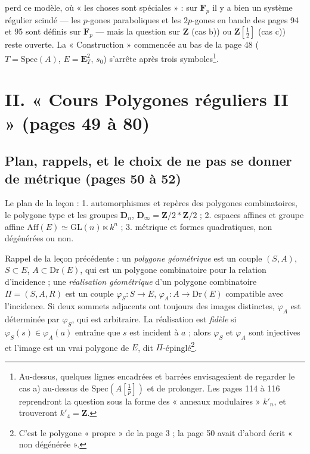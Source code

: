 \documentclass[11pt,a4paper]{article}
\begin{document}
perd ce modèle, où « les choses sont spéciales » : sur $\mathbf{F}_p$ il y a
bien un système régulier scindé --- les $p$-gones paraboliques et les
$2p$-gones en bande des pages 94 et 95 sont définis sur $\mathbf{F}_p$ --- mais
la question sur $\mathbf{Z}$ (cas b)) ou $\mathbf{Z}[\frac12]$ (cas c)) reste
ouverte. La « Construction » commencée au bas de la page 48 ($T =
\mathrm{Spec}(A)$, $E = \mathbf{E}^2_T$, $s_0$) s'arrête après trois
symboles\footnote{Au-dessus, quelques lignes encadrées et barrées
envisageaient de regarder le cas a) au-dessus de $\mathrm{Spec}(A[\frac1p])$ et
de prolonger. Les pages 114 à 116 reprendront la question sous la forme des
« anneaux modulaires » $k'_n$, et trouveront $k'_4 = \mathbf{Z}$.}.

\section*{II. « Cours Polygones réguliers II » (pages 49 à 80)}

\subsection*{Plan, rappels, et le choix de ne pas se donner de métrique (pages 50 à 52)}

Le plan de la leçon : 1. automorphismes et repères des polygones
combinatoires, le polygone type et les groupes $\mathbf{D}_n$,
$\mathbf{D}_\infty = \mathbf{Z}/2 * \mathbf{Z}/2$ ; 2. espaces affines et
groupe affine $\mathrm{Aff}(E) \simeq \mathrm{GL}(n) \ltimes k^n$ ; 3. métrique
et formes quadratiques, non dégénérées ou non.

Rappel de la leçon précédente : un \emph{polygone géométrique} est un couple
$(S, A)$, $S \subset E$, $A \subset \mathrm{Dr}(E)$, qui est un polygone
combinatoire pour la relation d'incidence ; une \emph{réalisation
géométrique} d'un polygone combinatoire $\Pi = (S, A, R)$ est un couple
$\varphi_S : S \to E$, $\varphi_A : A \to \mathrm{Dr}(E)$ compatible avec
l'incidence. Si deux sommets adjacents ont toujours des images distinctes,
$\varphi_A$ est déterminée par $\varphi_S$, qui est arbitraire. La réalisation
est \emph{fidèle} si $\varphi_S(s) \in \varphi_A(a)$ entraîne que $s$ est
incident à $a$ ; alors $\varphi_S$ et $\varphi_A$ sont injectives et l'image
est un vrai polygone de $E$, dit $\Pi$-épinglé\footnote{C'est le polygone
« propre » de la page 3 ; la page 50 avait d'abord écrit « non dégénérée ».}.
\end{document}
